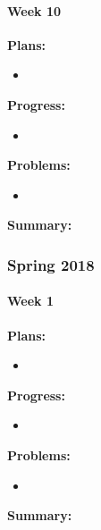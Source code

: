 \paragraph{Week 10}
\begin{adjustwidth}{2.5em}{0pt} 
    \vspace{-0.5cm}\textbf{Plans:}
    \vspace{-0.5cm}
    \begin{itemize}
        \item 
    \end{itemize} 
    \vspace{-0.3cm}\textbf{Progress:}
    \vspace{-0.5cm}
    \begin{itemize}
        \item 
    \end{itemize} 
    \vspace{-0.3cm}\textbf{Problems:}
    \vspace{-0.5cm}
    \begin{itemize}
        \item 
    \end{itemize} 
    \vspace{-0.3cm}\noindent\textbf{Summary:}\\
    \noindent 
\end{adjustwidth} 

\subsubsection{Spring 2018}

\paragraph{Week 1}
\begin{adjustwidth}{2.5em}{0pt}
    \vspace{-0.5cm}\textbf{Plans:}
    \vspace{-0.5cm}
    \begin{itemize}
        \item  
    \end{itemize} 
    \vspace{-0.3cm}\textbf{Progress:}
    \vspace{-0.5cm}
    \begin{itemize}
        \item  
    \end{itemize} 
    \vspace{-0.3cm}\textbf{Problems:}
    \vspace{-0.5cm}
    \begin{itemize}
        \item  
    \end{itemize}  
    \vspace{-0.3cm}\noindent\textbf{Summary:}\\
    \noindent 
\end{adjustwidth}

